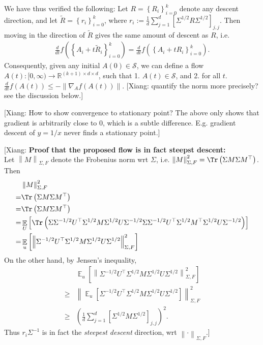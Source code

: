 \documentclass{article}
\DeclareMathOperator{\E}{\mathbb{E}}
\newcommand{\R}{\mathbb{R}}
\renewcommand{\S}{{\mathcal S}}
\newcommand*\lrb[1]{\left[ #1 \right]}
\newcommand*\lrn[1]{\left\| #1 \right\|}
\newcommand*\lrp[1]{\left( #1 \right)}
\newcommand*\lrbb[1]{\left\{ #1 \right\}}
\newcommand{\xc}[1]{{\color{black!2!green} [Xiang: #1]}}
\begin{document}
We have thus verified the following: Let $R= \lrbb{R_i}_{i=0}^k$ denote any descent direction, and let $\tilde{R}= \lrbb{r_i}_{i=0}^k$, where $r_i := \frac{1}{d} \sum_{j=1}^d \lrb{\Sigma^{1/2} R \Sigma^{1/2}}_{j,j}$. Then moving in the direction of $\tilde{R}$ gives the same amount of descent as $R$, i.e.
\begin{align*}
\frac{d}{dt} f\lrp{\lrbb{A_i + t\tilde{R}_i}_{i=0}^k} = \frac{d}{dt} f\lrp{\lrbb{A_i + t R_i}_{i=0}^k}.
\end{align*}
Consequently, given any initial $A(0) \in \S$, we can define a flow $A(t) : [0,\infty) \to \R^{(k+1)\times d \times d}$, such that 1. $A(t) \in \S$, and 2. for all $t$. $\frac{d}{dt} f(A(t)) \leq -\lrn{\nabla_A f(A(t))}$. \xc{quantify the norm more precisely? see the discussion below.}

\xc{How to show convergence to stationary point? The above only shows that gradient is arbitrarily close to $0$, which is a subtle difference. E.g. gradient descent of $y = 1/x$ never finds a stationary point.}


\xc{\textbf{Proof that the proposed flow is in fact steepst descent:}\\
Let $\lrn{M}_{\Sigma, F}$ denote the Frobenius norm wrt $\Sigma$, i.e. $\lrn{M}_{\Sigma, F}^2 = \Tr\lrp{\Sigma M \Sigma M^{\top}}$. Then 
\begin{align*}
& \lrn{M}_{\Sigma, F}^2\\
=& \Tr\lrp{\Sigma M \Sigma M^{\top}}\\
=& \Tr\lrp{\Sigma M \Sigma M^{\top}}\\
=& \E_U\lrb{\Tr\lrp{\Sigma \Sigma^{-1/2} U^\top \Sigma^{1/2} M \Sigma^{1/2} U \Sigma^{-1/2}\Sigma \Sigma^{-1/2} U^\top \Sigma^{1/2} M^{\top} \Sigma^{1/2} U \Sigma^{-1/2}}}\\
=& \E_u \lrb{\lrn{\Sigma^{-1/2} U^\top \Sigma^{1/2} M \Sigma^{1/2} U \Sigma^{1/2}}_{\Sigma, F}^2}
\end{align*}
On the other hand, by Jensen's inequality, 
\begin{align*}
& \E_u \lrb{\lrn{\Sigma^{-1/2} U^\top \Sigma^{1/2} M \Sigma^{1/2} U \Sigma^{1/2}}_{\Sigma, F}^2}\\
\geq& \lrn{\E_u \lrb{\Sigma^{-1/2} U^\top \Sigma^{1/2} M \Sigma^{1/2} U \Sigma^{1/2}}}_{\Sigma, F}^2\\
\geq& \lrp{\frac{1}{d} \sum_{j=1}^d \lrb{\Sigma^{1/2} M \Sigma^{1/2}}_{j,j}}^2.
\end{align*}
Thus $r_i \Sigma^{-1}$ is in fact the \emph{steepest descent} direction, wrt $\lrn{\cdot}_{\Sigma, F}$.}
\end{document}
